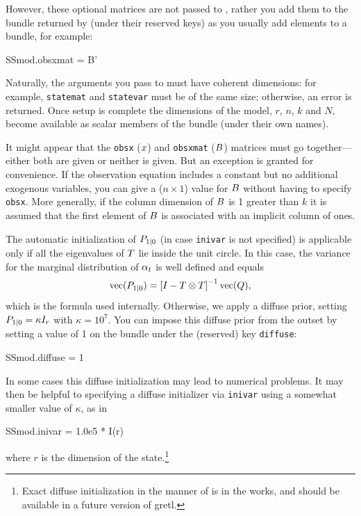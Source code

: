 However, these optional matrices are not passed to ,
rather you add them to the bundle returned by  (under
their reserved keys) as you usually add elements to a bundle, for
example:
\begin{code}
SSmod.obsxmat = B'
\end{code}

Naturally, the arguments you pass to  must have coherent
dimensions: for example, \texttt{statemat} and \texttt{statevar} must
be of the same size; otherwise, an error is returned. Once setup is
complete the dimensions of the model, $r$, $n$, $k$ and $N$, become
available as scalar members of the bundle (under their own names).

It might appear that the \texttt{obsx} ($x$) and \texttt{obsxmat}
($B$) matrices must go together---either both are given or
neither is given.  But an exception is granted for convenience.  If
the observation equation includes a constant but no additional
exogenous variables, you can give a ($n \times 1$) value for
$B$ without having to specify \texttt{obsx}.  More generally,
if the column dimension of $B$ is 1 greater than $k$ it is
assumed that the first element of $B$ is associated with an
implicit column of ones.

The automatic initialization of $P_{1|0}$ (in case
\texttt{inivar} is not specified) is applicable only if all the
eigenvalues of $T$ lie inside the unit circle. In this case,
the variance for the marginal distribution of $\alpha_t$ is well
defined and equals
\[
\mbox{vec}(P_{1|0}) = \left[ I - T \otimes T
\right]^{-1} \mbox{vec}(Q) ,
\]
which is the formula used internally. Otherwise, we apply a diffuse
prior, setting $P_{1|0} = \kappa I_r$ with $\kappa = 10^7$.
You can impose this diffuse prior from the outset by setting a value
of 1 on the bundle under the (reserved) key \texttt{diffuse}:
%
\begin{code}
SSmod.diffuse = 1
\end{code}
%
In some cases this diffuse initialization may lead to numerical
problems. It may then be helpful to specifying a diffuse initializer
via \texttt{inivar} using a somewhat smaller value of $\kappa$, as in
%
\begin{code}
SSmod.inivar = 1.0e5 * I(r)
\end{code}
where $r$ is the dimension of the state.\footnote{Exact diffuse
  initialization in the manner of \cite{koopman97} is in the works,
  and should be available in a future version of gretl.}

